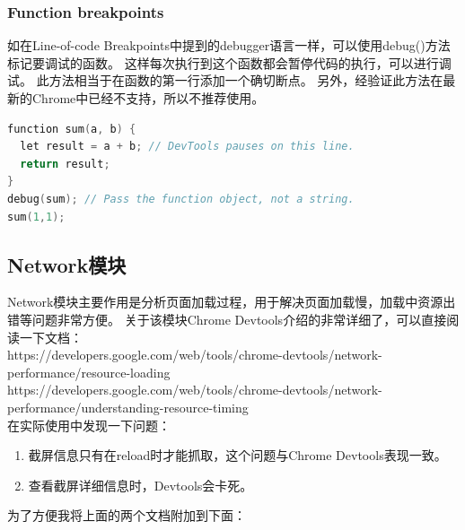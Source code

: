 \subsubsection{Function breakpoints}
如在Line-of-code Breakpoints中提到的debugger语言一样，可以使用debug()方法标记要调试的函数。
这样每次执行到这个函数都会暂停代码的执行，可以进行调试。
此方法相当于在函数的第一行添加一个确切断点。
另外，经验证此方法在最新的Chrome中已经不支持，所以不推荐使用。
\begin{spacing}{1.0}
\begin{lstlisting}[language={C++}]
function sum(a, b) {
  let result = a + b; // DevTools pauses on this line.
  return result;
}
debug(sum); // Pass the function object, not a string.
sum(1,1);
\end{lstlisting}
\end{spacing}

\subsection{Network模块}
Network模块主要作用是分析页面加载过程，用于解决页面加载慢，加载中资源出错等问题非常方便。
关于该模块Chrome Devtools介绍的非常详细了，可以直接阅读一下文档：\\
https://developers.google.com/web/tools/chrome-devtools/network-performance/resource-loading\\
https://developers.google.com/web/tools/chrome-devtools/network-performance/understanding-resource-timing\\

在实际使用中发现一下问题：
\begin{enumerate}
\item 截屏信息只有在reload时才能抓取，这个问题与Chrome Devtools表现一致。
\item 查看截屏详细信息时，Devtools会卡死。
\end{enumerate}


为了方便我将上面的两个文档附加到下面：
 
 

